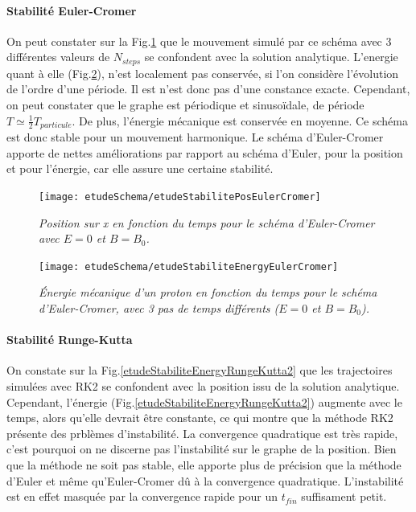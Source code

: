 \documentclass[a4paper,12pt,oneside]{article}
\begin{document}
\paragraph{Stabilité Euler-Cromer}
 On peut constater sur la  Fig.\ref{etudeStabilitePosEulerCromer} que le mouvement simulé par ce schéma avec 3 différentes valeurs de $N_{steps}$ se confondent avec la solution analytique. L'energie quant à elle (Fig.\ref{etudeStabiliteEnergyEulerCromer}), n'est localement pas conservée, si l'on considère l'évolution de l'ordre d'une période. Il est n'est donc pas d'une constance exacte. Cependant, on peut constater que le graphe est périodique et sinusoïdale, de période $T\simeq\frac{1}{2}T_{particule}$. De plus, l'énergie mécanique est conservée en moyenne. Ce schéma est donc stable pour un mouvement harmonique. Le schéma d'Euler-Cromer apporte de nettes améliorations par rapport au schéma d'Euler, pour la position et pour l'énergie, car elle assure une certaine stabilité.
\begin{figure}[H]
\centerline{\texttt{[image: etudeSchema/etudeStabilitePosEulerCromer]}}
\caption{ \label{etudeStabilitePosEulerCromer}\em
 Position sur x en fonction du temps pour le schéma d'Euler-Cromer avec $E=0$ et $B=B_0$.
}
\end{figure}
\begin{figure} [H]
\centerline{\texttt{[image: etudeSchema/etudeStabiliteEnergyEulerCromer]}}
\caption{ \label{etudeStabiliteEnergyEulerCromer}\em
 Énergie mécanique d'un proton en fonction du temps pour le schéma d'Euler-Cromer, avec 3 pas de temps différents ($E=0$ et $B=B_0$).
}
\end{figure}

\paragraph{Stabilité Runge-Kutta}
On constate sur la Fig.\ref{etudeStabiliteEnergyRungeKutta2} que les trajectoires simulées avec RK2 se confondent avec la position issu de la solution analytique. Cependant, l'énergie (Fig.\ref{etudeStabiliteEnergyRungeKutta2}) augmente avec le temps, alors qu'elle devrait être constante, ce qui montre que la méthode RK2 présente des prblèmes d'instabilité. La convergence quadratique est très rapide, c'est pourquoi on ne discerne pas l'instabilité sur le graphe de la position. Bien que la méthode ne soit pas stable, elle apporte plus de précision que la méthode d'Euler et même qu'Euler-Cromer dû à la convergence quadratique. L'instabilité est en effet masquée par la convergence rapide pour un $t_{fin}$ suffisament petit. 
\end{document}
